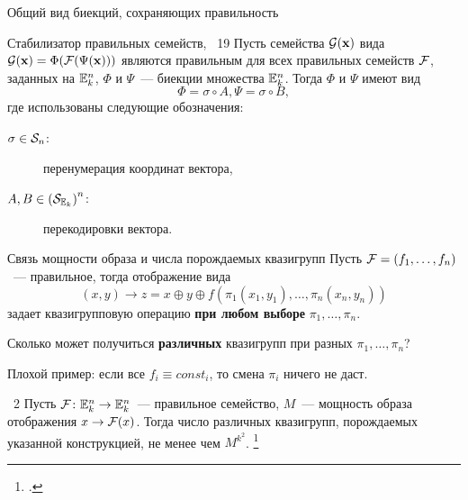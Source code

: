 \begin{frame}{Общий вид биекций, сохраняющих правильность}
    \begin{mytheorem}{Стабилизатор правильных семейств, \thm~19}
        Пусть семейства $\mathcal{G}(\mathbf{x})$ вида $\mathcal{G}(\mathbf{x}) = \Phi(\mathcal{F}(\Psi(\mathbf{x})))$ являются правильным для всех правильных семейств $\mathcal{F}$, заданных на $\mathbb{E}_k^n$, $\Phi$ и $\Psi$~--- биекции множества $\mathbb{E}_k^n$.
        Тогда $\Phi$ и $\Psi$ имеют вид 
        \[
            \Phi = \sigma \circ A, \Psi = \sigma \circ B, 
        \]
        где использованы следующие обозначения:
        \begin{description}
            \item[$\sigma \in \mathcal{S}_n$:] перенумерация координат вектора,
            \item[$A, B \in \left( \mathcal{S}_{\mathbb{E}_k} \right)^n$:] перекодировки вектора. 
        \end{description}
    \end{mytheorem}
\end{frame}


\begin{frame}{Связь мощности образа и числа порождаемых квазигрупп}
    Пусть $\mathcal{F} = (f_1, \ldots, f_n)$~--- правильное, тогда отображение вида 
    \[
        (x, y) \to z = x \oplus y \oplus f(\pi_1(x_1, y_1), \ldots, \pi_n(x_n, y_n))
    \]
    задает квазигрупповую операцию \textbf{при любом выборе} $\pi_1, \ldots, \pi_n$.
    \pause 
    \begin{coloritemize}
        \item Сколько может получиться \textbf{различных} квазигрупп при разных $\pi_1, \ldots, \pi_n$?
        \pause 
        \item Плохой пример: если все $f_i \equiv const_i$, то смена $\pi_i$ ничего не даст.
    \end{coloritemize}
    \begin{mypropos}{\propos~2}
        Пусть $\mathcal{F} \colon \mathbb{E}_k^n \to \mathbb{E}_k^n$~--- правильное семейство, $M$~--- мощность образа отображения $x \to \mathcal{F}(x)$.
        Тогда число различных квазигрупп, порождаемых указанной конструкцией, не менее чем $M^{k^2}$.
        \footcitetext{galatenko23}
    \end{mypropos}
\end{frame}


